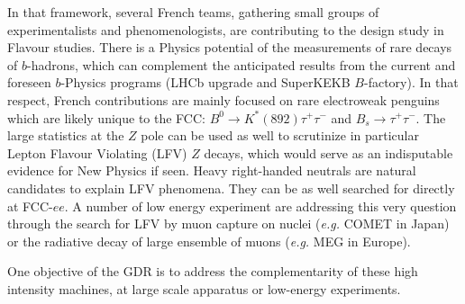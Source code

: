In that framework, several French teams, gathering small groups of experimentalists and phenomenologists, are contributing to the design study in Flavour studies.  
There is a Physics potential of the measurements of rare decays of $b$-hadrons, which can complement  the anticipated results from the current and foreseen $b$-Physics programs (LHCb upgrade and SuperKEKB $B$-factory). In that respect, French contributions are mainly focused on rare electroweak penguins which are likely unique to the FCC: $B^0 \to K^*(892) \tau^+\tau^-$ and $B_s \to \tau^+ \tau^-$.   
The large statistics at the $Z$ pole can be used as well to scrutinize in particular Lepton Flavour Violating (LFV) $Z$ decays, which would serve as an indisputable evidence for New Physics if seen. Heavy right-handed neutrals are natural candidates to explain LFV phenomena. They can be as well searched for directly at FCC-$ee$. A number of low energy experiment are addressing this very question through the search for LFV by muon capture on nuclei ({\it e.g.} COMET in Japan) or the radiative decay of large ensemble of muons ({\it e.g.} MEG in Europe). 

One objective of the GDR is to address the complementarity of these high intensity machines,  at large scale apparatus or low-energy experiments.       

